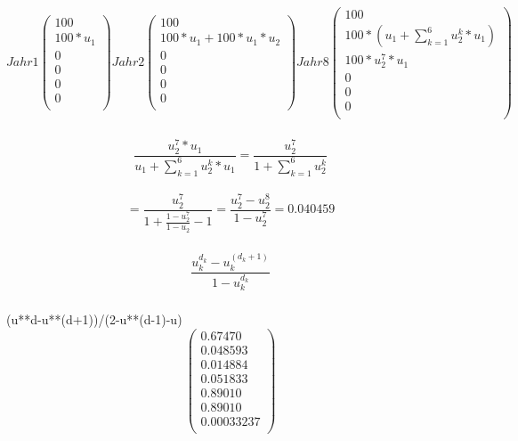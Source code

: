 \documentclass{article}
\begin{document}
\subsubsection{}
\[
Jahr 1
  \begin{pmatrix}
    100 \\
    100 * u_1 \\
    0 \\
    0 \\
    0 \\
    0 \\
  \end{pmatrix}
Jahr 2
  \begin{pmatrix}
    100 \\
    100 * u_1 + 100 * u_1 * u_2\\
    0 \\
    0 \\
    0 \\
    0 \\
  \end{pmatrix}
Jahr 8
  \begin{pmatrix}
    100 \\
    100 * (u_1 + \sum_{k=1}^{6} u_2^k * u_1) \\
    100 * u_2^7 * u_1 \\
    0 \\
    0 \\
    0 \\
  \end{pmatrix}
\]

\subsubsection{}
\Large {
$$\frac{u_2^7 * u_1}{u_1 + \sum_{k=1}^{6} u_2^k * u_1} 
= \frac{u_2^7}{1 + \sum_{k=1}^{6} u_2^k}$$ \\
$$= \frac{u_2^7}{1 + \frac{1 - u_2^7}{1 - u_2}-1} =
 \frac{u_2^7 - u_2^8}{1-u_2^7} = 0.040459$$
}

\subsubsection{}
\Large {
$$\frac{u_k^{d_k} - u_k^{(d_k+1)}}{1-u_k^{d_k}}$$
}

\subsubsection{}
(u**d-u**(d+1))/(2-u**(d-1)-u)
\[
    \begin{pmatrix}
     0.67470 \\
     0.048593 \\
     0.014884  \\
     0.051833 \\
     0.89010 \\
     0.89010 \\
     0.00033237 \\
    \end{pmatrix}
\]


\subsection{}
\end{document}
